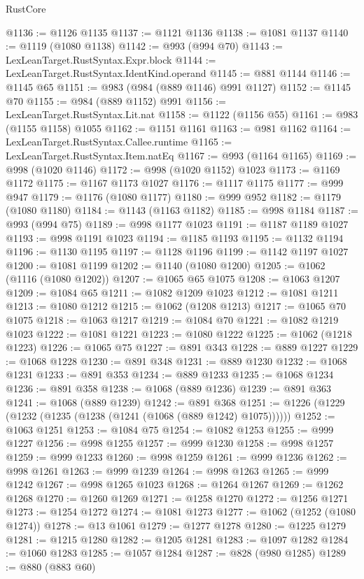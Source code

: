 \begin{lexlean}{RustCore}
\begin{coremodule}
@1136 := @1126 @1135
@1137 := @1121 @1136
@1138 := @1081 @1137
@1140 := @1119 (@1080 @1138)
@1142 := @993 (@994 @70)
@1143 := LexLeanTarget.RustSyntax.Expr.block
@1144 := LexLeanTarget.RustSyntax.IdentKind.operand
@1145 := @881 @1144
@1146 := @1145 @65
@1151 := @983 (@984 (@889 @1146) @991 @1127)
@1152 := @1145 @70
@1155 := @984 (@889 @1152) @991
@1156 := LexLeanTarget.RustSyntax.Lit.nat
@1158 := @1122 (@1156 @55)
@1161 := @983 (@1155 @1158) @1055
@1162 := @1151 @1161
@1163 := @981 @1162
@1164 := LexLeanTarget.RustSyntax.Callee.runtime
@1165 := LexLeanTarget.RustSyntax.Item.natEq
@1167 := @993 (@1164 @1165)
@1169 := @998 (@1020 @1146)
@1172 := @998 (@1020 @1152) @1023
@1173 := @1169 @1172
@1175 := @1167 @1173 @1027
@1176 := @1117 @1175
@1177 := @999 @947
@1179 := @1176 (@1080 @1177)
@1180 := @999 @952
@1182 := @1179 (@1080 @1180)
@1184 := @1143 (@1163 @1182)
@1185 := @998 @1184
@1187 := @993 (@994 @75)
@1189 := @998 @1177 @1023
@1191 := @1187 @1189 @1027
@1193 := @998 @1191 @1023
@1194 := @1185 @1193
@1195 := @1132 @1194
@1196 := @1130 @1195
@1197 := @1128 @1196
@1199 := @1142 @1197 @1027
@1200 := @1081 @1199
@1202 := @1140 (@1080 @1200)
@1205 := @1062 (@1116 (@1080 @1202))
@1207 := @1065 @65 @1075
@1208 := @1063 @1207
@1209 := @1084 @65
@1211 := @1082 @1209 @1023
@1212 := @1081 @1211
@1213 := @1080 @1212
@1215 := @1062 (@1208 @1213)
@1217 := @1065 @70 @1075
@1218 := @1063 @1217
@1219 := @1084 @70
@1221 := @1082 @1219 @1023
@1222 := @1081 @1221
@1223 := @1080 @1222
@1225 := @1062 (@1218 @1223)
@1226 := @1065 @75
@1227 := @891 @343
@1228 := @889 @1227
@1229 := @1068 @1228
@1230 := @891 @348
@1231 := @889 @1230
@1232 := @1068 @1231
@1233 := @891 @353
@1234 := @889 @1233
@1235 := @1068 @1234
@1236 := @891 @358
@1238 := @1068 (@889 @1236)
@1239 := @891 @363
@1241 := @1068 (@889 @1239)
@1242 := @891 @368
@1251 := @1226 (@1229 (@1232 (@1235 (@1238 (@1241 (@1068 (@889 @1242) @1075))))))
@1252 := @1063 @1251
@1253 := @1084 @75
@1254 := @1082 @1253
@1255 := @999 @1227
@1256 := @998 @1255
@1257 := @999 @1230
@1258 := @998 @1257
@1259 := @999 @1233
@1260 := @998 @1259
@1261 := @999 @1236
@1262 := @998 @1261
@1263 := @999 @1239
@1264 := @998 @1263
@1265 := @999 @1242
@1267 := @998 @1265 @1023
@1268 := @1264 @1267
@1269 := @1262 @1268
@1270 := @1260 @1269
@1271 := @1258 @1270
@1272 := @1256 @1271
@1273 := @1254 @1272
@1274 := @1081 @1273
@1277 := @1062 (@1252 (@1080 @1274))
@1278 := @13 @1061
@1279 := @1277 @1278
@1280 := @1225 @1279
@1281 := @1215 @1280
@1282 := @1205 @1281
@1283 := @1097 @1282
@1284 := @1060 @1283
@1285 := @1057 @1284
@1287 := @828 (@980 @1285)
@1289 := @880 (@883 @60)

\end{coremodule}
\end{lexlean}
